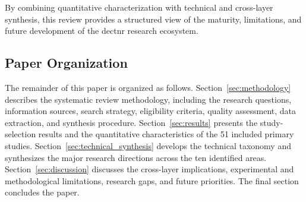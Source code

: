 By combining quantitative characterization with technical and cross-layer
synthesis, this review provides a structured view of the maturity,
limitations, and future development of the \gls{dectnr} research ecosystem.

\subsection{Paper Organization}
\label{subsec:paper_organization}

The remainder of this paper is organized as follows.
Section~\ref{sec:methodology} describes the systematic review methodology,
including the research questions, information sources, search strategy,
eligibility criteria, quality assessment, data extraction, and synthesis
procedure. Section~\ref{sec:results} presents the study-selection results and
the quantitative characteristics of the 51 included primary studies.
Section~\ref{sec:technical_synthesis} develops the technical taxonomy and
synthesizes the major research directions across the ten identified areas.
Section~\ref{sec:discussion} discusses the cross-layer implications,
experimental and methodological limitations, research gaps, and future
priorities. The final section concludes the paper.